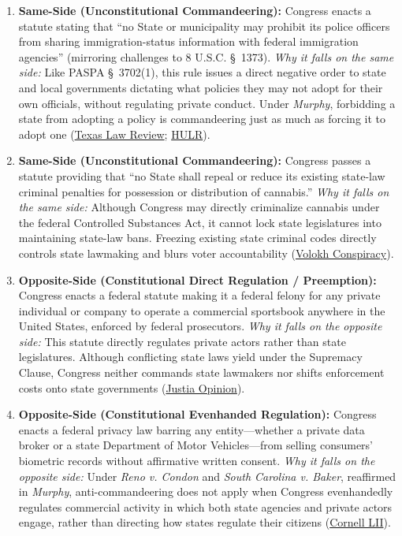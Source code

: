 \documentclass[12pt]{article}
\begin{document}
\begin{enumerate}
    \item \textbf{Same-Side (Unconstitutional Commandeering):} Congress enacts a statute stating that ``no State or municipality may prohibit its police officers from sharing immigration-status information with federal immigration agencies'' (mirroring challenges to 8 U.S.C. \S~1373). \textit{Why it falls on the same side:} Like PASPA \S~3702(1), this rule issues a direct negative order to state and local governments dictating what policies they may not adopt for their own officials, without regulating private conduct. Under \textit{Murphy}, forbidding a state from adopting a policy is commandeering just as much as forcing it to adopt one (\href{https://texaslawreview.org/making-federalism-great-again/}{Texas Law Review}; \href{https://hulr.org/spring-2022/murphy-v-ncaa}{HULR}).

    \item \textbf{Same-Side (Unconstitutional Commandeering):} Congress passes a statute providing that ``no State shall repeal or reduce its existing state-law criminal penalties for possession or distribution of cannabis.'' \textit{Why it falls on the same side:} Although Congress may directly criminalize cannabis under the federal Controlled Substances Act, it cannot lock state legislatures into maintaining state-law bans. Freezing existing state criminal codes directly controls state lawmaking and blurs voter accountability (\href{https://reason.com/volokh/2018/05/14/sports-gambling-decision-is-a-major-vict/}{Volokh Conspiracy}).

    \item \textbf{Opposite-Side (Constitutional Direct Regulation / Preemption):} Congress enacts a federal statute making it a federal felony for any private individual or company to operate a commercial sportsbook anywhere in the United States, enforced by federal prosecutors. \textit{Why it falls on the opposite side:} This statute directly regulates private actors rather than state legislatures. Although conflicting state laws yield under the Supremacy Clause, Congress neither commands state lawmakers nor shifts enforcement costs onto state governments (\href{https://supreme.justia.com/cases/federal/us/584/16-476/}{Justia Opinion}).

    \item \textbf{Opposite-Side (Constitutional Evenhanded Regulation):} Congress enacts a federal privacy law barring any entity---whether a private data broker or a state Department of Motor Vehicles---from selling consumers' biometric records without affirmative written consent. \textit{Why it falls on the opposite side:} Under \textit{Reno v. Condon} and \textit{South Carolina v. Baker}, reaffirmed in \textit{Murphy}, anti-commandeering does not apply when Congress evenhandedly regulates commercial activity in which both state agencies and private actors engage, rather than directing how states regulate their citizens (\href{https://www.law.cornell.edu/supremecourt/text/16-476}{Cornell LII}).


\end{enumerate}
\end{document}
